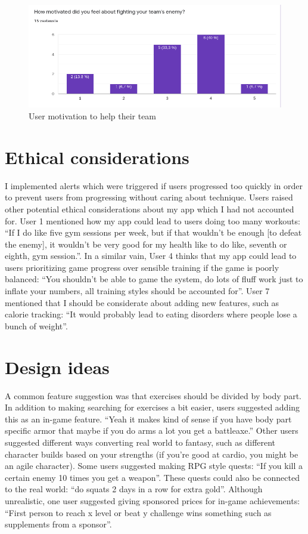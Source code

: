 \documentclass{l4proj}
\begin{document}
\begin{figure}[H]
    \centering
    \includegraphics[width=1.0\linewidth]{team_motivation.png}    
    \caption{User motivation to help their team}
    \label{fig:group_motivation} 
\end{figure}

\section{Ethical considerations}
I implemented alerts which were triggered if users progressed too quickly in order to prevent users from progressing without caring about technique. Users raised other potential ethical considerations about my app which I had not accounted for. User 1 mentioned how my app could lead to users doing too many workouts: ``If I do like five gym sessions per week, but if that wouldn't be enough [to defeat the enemy], it wouldn't be very good for my health like to do like, seventh or eighth, gym session.''. In a similar vain, User 4 thinks that my app could lead to users prioritizing game progress over sensible training if the game is poorly balanced: ``You shouldn't be able to game the system, do lots of fluff work just to inflate your numbers, all training styles should be accounted for''. User 7 mentioned that I should be considerate about adding new features, such as calorie tracking: ``It would probably lead to eating disorders where people lose a bunch of weight''.

\section{Design ideas}
A common feature suggestion was that exercises should be divided by body part. In addition to making searching for exercises a bit easier, users suggested adding this as an in-game feature. ``Yeah it makes kind of sense if you have body part specific armor that maybe if you do arms a lot you get a battleaxe.'' Other users suggested different ways converting real world to fantasy, such as different character builds based on your strengths (if you're good at cardio, you might be an agile character). Some users suggested making RPG style quests: ``If you kill a certain enemy 10 times you get a weapon''. These quests could also be connected to the real world: ``do squats 2 days in a row for extra gold''. Although unrealistic, one user suggested giving sponsored prices for in-game achievements: ``First person to reach x level or beat y challenge wins something such as supplements from a sponsor''.
\end{document}
